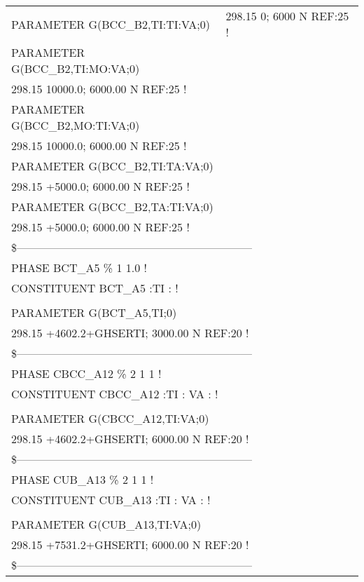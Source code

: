 \begin{longtable}[H]{ l l l }
	PARAMETER G(BCC\_B2,TI:TI:VA;0) & \multicolumn{2}{l}{298.15 0; 6000 N REF:25 !}\\ 
	PARAMETER G(BCC\_B2,TI:MO:VA;0) & & \\
	\multicolumn{3}{l}{298.15 10000.0; 6000.00 N REF:25 !}\\
	PARAMETER G(BCC\_B2,MO:TI:VA;0) & & \\
	\multicolumn{3}{l}{298.15 10000.0; 6000.00 N REF:25 !}\\	 
	PARAMETER G(BCC\_B2,TI:TA:VA;0) & & \\
	\multicolumn{3}{l}{298.15 +5000.0; 6000.00 N REF:25 !}\\
	PARAMETER G(BCC\_B2,TA:TI:VA;0) & & \\
	\multicolumn{3}{l}{298.15 +5000.0; 6000.00 N REF:25 !}\\
	\multicolumn{3}{l}{\$---------------------------------------------------------------}\\
	\multicolumn{3}{l}{PHASE BCT\_A5  \%  1  1.0  !}\\
	\multicolumn{3}{l}{CONSTITUENT BCT\_A5  :TI :  !}\\
	& & \\
	PARAMETER G(BCT\_A5,TI;0) & & \\
	\multicolumn{3}{l}{298.15 +4602.2+GHSERTI; 3000.00 N REF:20 !}\\
	\multicolumn{3}{l}{\$---------------------------------------------------------------}\\
	\multicolumn{3}{l}{PHASE CBCC\_A12  \%  2 1   1 !}\\
	\multicolumn{3}{l}{CONSTITUENT CBCC\_A12  :TI : VA :  !}\\
	& & \\
	PARAMETER G(CBCC\_A12,TI:VA;0) & & \\
	\multicolumn{3}{l}{298.15 +4602.2+GHSERTI; 6000.00 N REF:20 !}\\
	\multicolumn{3}{l}{\$---------------------------------------------------------------}\\
	\multicolumn{3}{l}{PHASE CUB\_A13  \%  2 1   1 !}\\
	\multicolumn{3}{l}{CONSTITUENT CUB\_A13  :TI : VA :  !}\\
	& & \\
	PARAMETER G(CUB\_A13,TI:VA;0) & & \\
	\multicolumn{3}{l}{298.15 +7531.2+GHSERTI; 6000.00 N REF:20 !}\\
	\multicolumn{3}{l}{\$---------------------------------------------------------------}\\

\end{longtable}
